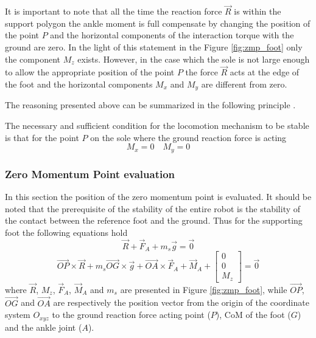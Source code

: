 It is important to note that all the time the reaction force $\vec{R}$ is within the support polygon
the ankle moment is full compensate by changing the position of the point $P$ and the horizontal
components of the interaction torque with the ground are zero. In the light of this statement in the
Figure \ref{fig:zmp_foot} only the component $M_z$ exists.
However, in the case which the sole is not large enough to allow the appropriate position of the
point $P$ the force $\vec{R}$ acts at the edge of the foot and the horizontal components $M_x$ and
$M_y$ are different from zero.
\par
The reasoning presented above can be summarized in the following principle \cite{Vukobratov2004}.
\begin{principle}
  The necessary and sufficient condition for the locomotion mechanism to be stable
  is that for the point $P$ on the sole where the ground reaction force is acting
  \[
  M_x = 0 \quad M_y = 0
  \]
\end{principle}
\subsubsection{Zero Momentum Point evaluation}
In this section the position of the zero momentum point is evaluated. It should be noted that the
prerequisite of the stability of the entire robot is the stability of the contact between the
reference foot and the ground. Thus for the supporting foot the following equations hold 
\[
\vec{R} + \vec{F}_A + m_s \vec{g} = \vec{0}
\]
\begin{equation}
  \label{eq:zmp_2_cardinal}
  \vec{OP} \times \vec{R} + m_s \vec{OG} \times \vec{g} + \vec{OA} \times \vec{F}_A + \vec{M}_A +
  \begin{bmatrix}
    0 \\
    0 \\
    M_z
  \end{bmatrix} = \vec{0}
\end{equation}
where $\vec{R}$, $M_z$, $\vec{F}_A$, $\vec{M}_A$ and $m_s$ are presented in Figure
\ref{fig:zmp_foot}, while $\vec{OP}$, $\vec{OG}$ and $\vec{OA}$ are respectively the position vector
from the origin of the coordinate system $O_{xyz}$ to the ground reaction force acting point ($P$),
CoM of the foot ($G$) and the ankle joint ($A$).
\par

